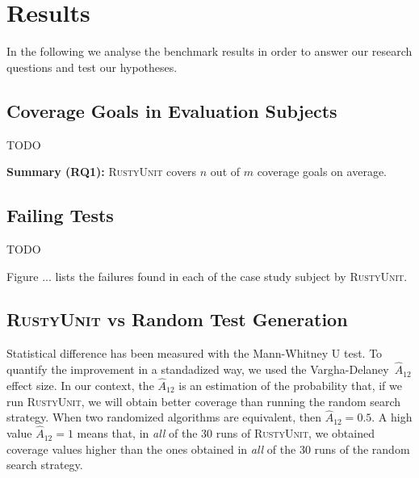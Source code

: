 \documentclass[paper=a4,%
  twoside,%
  BCOR4mm,%
  abstract=true,%
  toc=bibliography,%
  chapterprefix=true,%
  toc=bibliographynumbered,%
  open=right,%
  english,%
  pagesize=pdftex]{scrreprt}
\newcommand{\tech}{\textsc{RustyUnit}\xspace}
\newcommand{\runs}{30\xspace}
\begin{document}
\section{Results}
\label{sec:results}
In the following we analyse the benchmark results in order to answer our research questions and test our hypotheses. 

\subsection{Coverage Goals in Evaluation Subjects}

TODO 
\begin{tcolorbox}
\textbf{Summary (RQ1):} \tech covers $n$ out of $m$ coverage goals on average.  
\end{tcolorbox}

\subsection{Failing Tests}
TODO 

Figure ... lists the failures found in each of the case study subject by \tech. 

\subsection{\tech vs Random Test Generation}
Statistical difference has been measured with the Mann-Whitney U test. To quantify the improvement in a standadized way, we used the Vargha-Delaney~$\hat{A}_{12}$ effect size. In our context, the $\hat{A}_{12}$ is an estimation of the probability that, if we run \tech, we will obtain better coverage than running the random search strategy. When two randomized algorithms are equivalent, then $\hat{A}_{12} = 0.5$. A high value $\hat{A}_{12} = 1$ means that, in \emph{all} of the \runs runs of \tech, we obtained coverage values higher than the ones obtained in \emph{all} of the \runs runs of the random search strategy.
\end{document}
